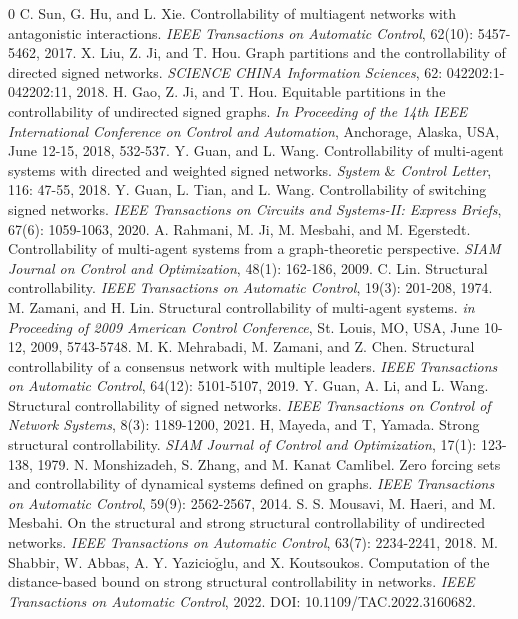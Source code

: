 \documentclass[a4paper,11pt]{article}
\begin{document}
{\begin{thebibliography}{0}
C. Sun, G. Hu, and L. Xie. Controllability of multiagent networks with antagonistic interactions. \emph{IEEE Transactions on Automatic Control}, 62(10): 5457-5462, 2017.
 X. Liu, Z. Ji, and T. Hou.   Graph partitions and the controllability of directed signed networks. \emph{SCIENCE CHINA Information Sciences}, 62: 042202:1-042202:11, 2018.
H. Gao, Z. Ji, and T. Hou. Equitable partitions in the controllability of undirected signed graphs. \emph{In Proceeding of the 14th IEEE International Conference on Control and Automation}, Anchorage, Alaska, USA, June 12-15, 2018, 532-537.
Y. Guan, and L. Wang. Controllability of multi-agent systems with directed and weighted signed networks. \emph{System $\&$ Control Letter}, 116: 47-55, 2018.
Y. Guan, L. Tian, and L. Wang. Controllability of switching signed networks. \emph{IEEE Transactions on Circuits and Systems-II: Express Briefs}, 67(6): 1059-1063, 2020.
A. Rahmani, M. Ji, M. Mesbahi, and M. Egerstedt. Controllability of multi-agent systems from a graph-theoretic perspective. \emph{SIAM Journal on Control and Optimization},  48(1): 162-186, 2009.
 C. Lin. Structural controllability. \emph{IEEE Transactions on Automatic Control}, 19(3): 201-208, 1974.
M. Zamani, and H. Lin. Structural controllability of multi-agent systems. \emph{in Proceeding of 2009 American Control Conference}, St. Louis, MO, USA, June 10-12, 2009, 5743-5748.
M. K. Mehrabadi, M. Zamani, and Z. Chen. Structural controllability of a consensus network with multiple leaders. \emph{IEEE Transactions on Automatic Control}, 64(12): 5101-5107, 2019.
Y. Guan, A. Li, and L. Wang. Structural controllability of signed networks. \emph{IEEE Transactions on Control of Network Systems}, 8(3): 1189-1200, 2021.
H, Mayeda, and T, Yamada. Strong structural controllability. \emph{SIAM Journal of Control and Optimization}, 17(1): 123-138, 1979.
N. Monshizadeh, S. Zhang, and M. Kanat Camlibel. Zero forcing sets and controllability of dynamical systems defined on graphs. \emph{IEEE Transactions on Automatic Control}, 59(9): 2562-2567, 2014.
S. S. Mousavi, M. Haeri, and M. Mesbahi. On the structural and strong structural controllability of undirected networks. \emph{IEEE Transactions on Automatic Control}, 63(7): 2234-2241, 2018.
M. Shabbir, W. Abbas, A. Y. Yazicio$\breve{\text{g}}$lu, and X. Koutsoukos. Computation of the distance-based bound on strong structural controllability in networks. \emph{IEEE Transactions on Automatic Control}, 2022. DOI: 10.1109/TAC.2022.3160682.

\end{thebibliography}}
\end{document}

